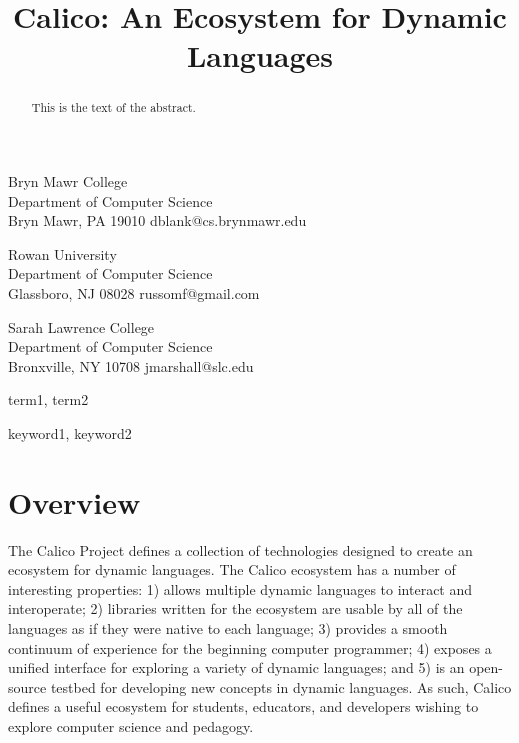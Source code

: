\documentclass[preprint]{sigplanconf}
\begin{document}


\title{Calico: An Ecosystem for Dynamic Languages}

           {Bryn Mawr College\\Department of Computer Science\\Bryn Mawr, PA 19010}
           {dblank@cs.brynmawr.edu}

           {Rowan University\\Department of Computer Science\\Glassboro, NJ 08028}
           {russomf@gmail.com}

           {Sarah Lawrence College\\Department of Computer Science\\Bronxville, NY 10708}
           {jmarshall@slc.edu}

\maketitle

\begin{abstract}
This is the text of the abstract.
\end{abstract}


\terms
term1, term2

\keywords
keyword1, keyword2

\section{Overview}

The Calico Project defines a collection of technologies designed to
create an ecosystem for dynamic languages. The Calico ecosystem has a
number of interesting properties: 1) allows multiple dynamic languages
to interact and interoperate; 2) libraries written for the ecosystem
are usable by all of the languages as if they were native to each
language; 3) provides a smooth continuum of experience for the
beginning computer programmer; 4) exposes a unified interface for
exploring a variety of dynamic languages; and 5) is an open-source
testbed for developing new concepts in dynamic languages. As such,
Calico defines a useful ecosystem for students, educators, and
developers wishing to explore computer science and pedagogy.
\end{document}
